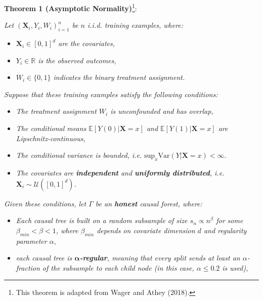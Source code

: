\documentclass[
  12pt,
  a4paper,
  oneside]{article}
\begin{document}
\textbf{Theorem 1 (Asymptotic Normality)}\footnote{This theorem is
  adapted from Wager and Athey (2018).}:

\textit{Let $(\textbf{X}_i, Y_i, W_i)_{i=1}^n$ be $n$ i.i.d. training examples, where:}

\begin{itemize}
\item
  \textit{$\textbf{X}_i \in [0,1]^d$ are the covariates,}
\item
  \textit{$Y_i \in \mathbb{R}$ is the observed outcomes,}
\item
  \textit{$W_i \in \{0,1\}$ indicates the binary treatment assignment.}
\end{itemize}

\textit{Suppose that these training examples satisfy the following conditions:}

\begin{itemize}
\item
  \textit{The treatment assignment $W_i$ is unconfounded and has overlap,}
\item
  \textit{The conditional means $\mathbb{E}[ Y(0) | \textbf{X} = x ]$ and $\mathbb{E}[ Y(1) | \textbf{X} = x ]$ are Lipschnitz-continuous,}
\item
  \textit{The conditional variance is bounded, i.e.}
  \(\text{sup}_x \text{Var} (Y | \textbf{X} = x) < \infty\).
\item
  \textit{The covariates are \textbf{independent} and \textbf{uniformly distributed}, i.e. $\textbf{X}_i \sim \mathcal{U}([0,1]^d)$.}
\end{itemize}

\textit{Given these conditions, let $\Gamma$ be an \textbf{honest} causal forest, where:}

\begin{itemize}
\item
  \textit{Each causal tree is built on a random subsample of size $s_n \propto n^\beta$ for some $\beta_{min} < \beta < 1$, where $\beta_{min}$ depends on covariate dimension $d$ and regularity parameter $\alpha$,}
\item
  \textit{each causal tree is $𝛂$\textbf{-regular}, meaning that every split sends at least an $\alpha$-fraction of the subsample to each child node (in this case, $\alpha \le 0.2$ is used),}
\end{itemize}
\end{document}
